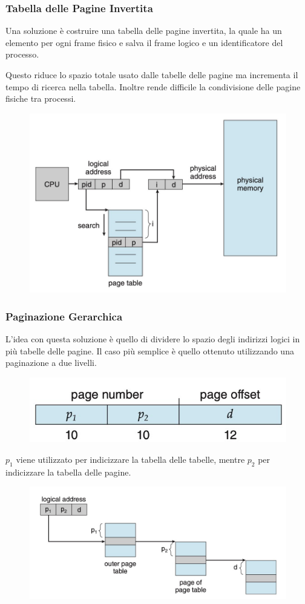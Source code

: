 \subsubsection*{Tabella delle Pagine Invertita}
Una soluzione è costruire una tabella delle pagine invertita, la quale ha un elemento per ogni frame fisico e salva il frame logico e un identificatore del processo.


Questo riduce lo spazio totale usato dalle tabelle delle pagine ma incrementa il tempo di ricerca nella tabella.
Inoltre rende difficile la condivisione delle pagine fisiche tra processi.

\begin{figure}[H]
    \centering
    \includegraphics[width=0.45\linewidth]{assets/tabella-pagine-invertita.jpg}
\end{figure}

\subsubsection*{Paginazione Gerarchica}
L'idea con questa soluzione è quello di dividere lo spazio degli indirizzi logici in più tabelle delle pagine. Il caso più semplice è quello ottenuto utilizzando una paginazione a due livelli.

\begin{figure}[H]
    \centering
    \includegraphics[width=0.35\linewidth]{assets/paginazione-doppia.jpg}
\end{figure}

$p_1$ viene utilizzato per indicizzare la tabella delle tabelle, mentre $p_2$ per indicizzare la tabella delle pagine.

\begin{figure}[H]
    \centering
    \includegraphics[width=0.5\linewidth]{assets/paginazione-gerarchica.jpg}
\end{figure}

